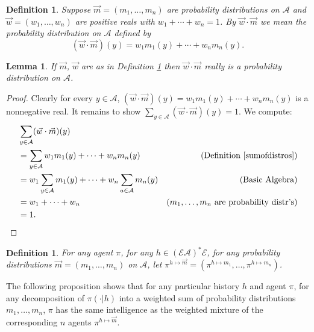 \documentclass[twoside]{article}
\newtheorem{definition}[theorem]{Definition}
\newtheorem{lemma}[theorem]{Lemma}
\begin{document}
\begin{definition}
\label{sumofdistros}
    Suppose $\vec m=(m_1,\ldots,m_n)$ are probability distributions on $\mathcal A$
    and $\vec w=(w_1,\ldots,w_n)$ are positive reals with
    $w_1+\cdots+w_n=1$. By $\vec w\cdot\vec m$ we mean the probability distribution
    on $\mathcal A$ defined by
    \[
        (\vec w\cdot\vec m)(y) = w_1m_1(y) + \cdots + w_nm_n(y).
    \]
\end{definition}

\begin{lemma}
    If $\vec m$, $\vec w$ are as in Definition \ref{sumofdistros}
    then $\vec w\cdot\vec m$ really is a probability distribution on $\mathcal A$.
\end{lemma}

\begin{proof}
    Clearly for every $y\in\mathcal A$,
    $(\vec w\cdot\vec m)(y) = w_1m_1(y) + \cdots + w_nm_n(y)$ is a nonnegative
    real. It remains to show $\sum_{y\in\mathcal A}(\vec w\cdot\vec m)(y)=1$.
    We compute:
    \begin{align*}
        &{} \sum_{y\in\mathcal A}(\vec w\cdot\vec m)(y)\\
        &=
        \sum_{y\in\mathcal A} w_1m_1(y) + \cdots + w_nm_n(y)
            &\mbox{(Definition \ref{sumofdistros})}\\
        &=
        w_1\sum_{y\in\mathcal A} m_1(y) + \cdots + w_n\sum_{a\in\mathcal A}m_n(y)
            &\mbox{(Basic Algebra)}\\
        &= w_1 + \cdots + w_n
            &\mbox{($m_1,\ldots,m_n$ are probability distr's)}\\
        &= 1.
    \end{align*}
\end{proof}

\begin{definition}
    For any agent $\pi$, for any $h\in(\mathcal E\mathcal A)^*\mathcal E$,
    for any probability distributions $\vec m=(m_1,\ldots,m_n)$ on $\mathcal A$,
    let $\pi^{h\mapsto \vec m}=(\pi^{h\mapsto m_1},\ldots,\pi^{h\mapsto m_n})$.
\end{definition}

The following proposition shows that
for any particular history $h$ and agent $\pi$,
for any decomposition of $\pi(\cdot|h)$ into a weighted sum
of probability distributions $m_1,\ldots,m_n$,
$\pi$ has the same intelligence as the weighted mixture of the corresponding $n$ agents
$\pi^{h\mapsto \vec m}$.
\end{document}
